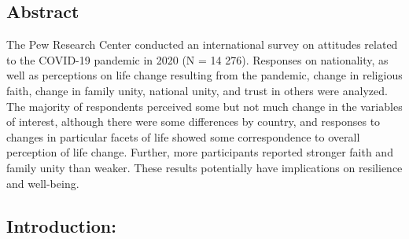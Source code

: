 \documentclass[
  english,
  man]{apa6}
\begin{document}
\hypertarget{abstract}{%
\subsection{Abstract}\label{abstract}}

The Pew Research Center conducted an international survey on attitudes related to the COVID-19 pandemic in 2020 (N = 14 276). Responses on nationality, as well as perceptions on life change resulting from the pandemic, change in religious faith, change in family unity, national unity, and trust in others were analyzed. The majority of respondents perceived some but not much change in the variables of interest, although there were some differences by country, and responses to changes in particular facets of life showed some correspondence to overall perception of life change. Further, more participants reported stronger faith and family unity than weaker. These results potentially have implications on resilience and well-being.

\hypertarget{introduction}{%
\subsection{Introduction:}\label{introduction}}
\end{document}
